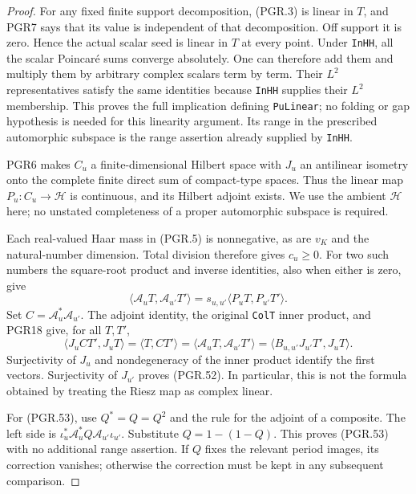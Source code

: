 \documentclass[11pt,a4paper]{article}
\numberwithin{equation}{section}
\theoremstyle{remark}\newtheorem{remark}[theorem]{Remark}
\begin{document}
\begin{proof}
For any fixed finite support decomposition, (PGR.3) is linear in
\(T\), and PGR7 says that its value is independent of that
decomposition.  Off support it is zero.  Hence the actual scalar
seed is linear in \(T\) at every point.  Under \texttt{In\allowbreak HH},
all the scalar Poincar\'e sums converge absolutely.  One can
therefore add them and multiply them by arbitrary complex scalars
term by term.  Their \(L^2\) representatives satisfy the same
identities because \texttt{In\allowbreak HH} supplies their \(L^2\)
membership.  This proves the full implication defining
\texttt{Pu\allowbreak Linear}; no folding or gap hypothesis is needed for
this linearity argument.  Its range in the prescribed automorphic
subspace is the range assertion already supplied by \texttt{In\allowbreak HH}.

PGR6 makes \(C_u\) a finite-dimensional Hilbert space with
\(J_u\) an antilinear isometry onto the complete finite direct
sum of compact-type spaces.  Thus the linear map \(P_u:C_u\to
\mathcal H\) is continuous, and its Hilbert adjoint exists.
We use the ambient \(\mathcal H\) here; no unstated completeness
of a proper automorphic subspace is required.

Each real-valued Haar mass in (PGR.5) is nonnegative, as are
\(v_K\) and the natural-number dimension.  Total division
therefore gives \(c_u\geq0\).  For two such numbers the
square-root product and inverse identities, also when either is
zero, give
\[
 \langle\mathcal A_uT,\mathcal A_{u'}T'\rangle
             =s_{u,u'}\langle P_uT,P_{u'}T'\rangle.
\tag{PGR.54}
\]
Set \(C=\mathcal A_u^*\mathcal A_{u'}\).  The adjoint
identity, the original \texttt{Col\allowbreak T} inner product, and PGR18
give, for all \(T,T'\),
\[
 \langle J_u C T',J_uT\rangle
   =\langle T,CT'\rangle
   =\langle\mathcal A_uT,\mathcal A_{u'}T'\rangle
   =\langle B_{u,u'}J_{u'}T',J_uT\rangle.
\]
Surjectivity of \(J_u\) and nondegeneracy of the inner product
identify the first vectors.  Surjectivity of \(J_{u'}\)
proves (PGR.52).  In particular, this is not the formula obtained
by treating the Riesz map as complex linear.

For (PGR.53), use \(Q^*=Q=Q^2\) and the rule for the adjoint
of a composite.  The left side is
\(\iota_u^*\mathcal A_u^*Q\mathcal A_{u'}\iota_{u'}\).
Substitute \(Q=1-(1-Q)\).  This proves (PGR.53) with no
additional range assertion.  If \(Q\) fixes the relevant period
images, its correction vanishes; otherwise the correction must be
kept in any subsequent comparison.
\end{proof}
\end{document}
